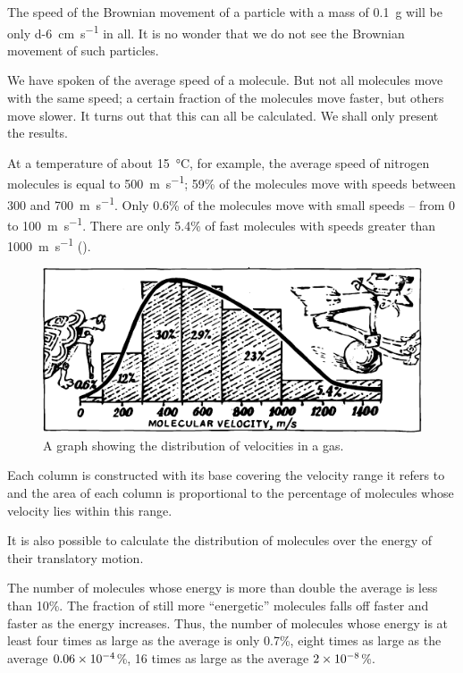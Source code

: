 The speed of the Brownian movement of a particle with a mass of \SI{0.1}{\gram} will be only \SI{d-6}{\centi\meter\per\second} in all. It is no wonder that we do not see the Brownian movement of such particles.

We have spoken of the average speed of a molecule. But not all molecules move with the same speed; a certain fraction of the molecules move faster, but others move slower. It turns out that this can all be calculated. We shall only present the results.

At a temperature of about \SI{15}{\celsius}, for example, the average speed of nitrogen molecules is equal to \SI{500}{\meter\per\second}; 59\% of the molecules move with speeds between 300 and \SI{700}{\meter\per\second}. Only 0.6\% of the molecules move with small speeds -- from 0 to \SI{100}{\meter\per\second}. There are only 5.4\% of fast molecules with speeds greater than \SI{1000}{\meter\per\second} ().

\begin{figure}[!ht]
\centering
\includegraphics[width=\textwidth]{figures/fig-03-02.pdf}
\caption{A graph showing the distribution of velocities in a gas.}
\label{fig-3.2}
\end{figure}

Each column is constructed with its base covering the velocity range it refers to and the area of each column is proportional to the percentage of molecules whose veloc­ity lies within this range.

It is also possible to calculate the distribution of molecules over the energy of their translatory motion.

The number of molecules whose energy is more than double the average is less than 10\%. The fraction of still more “energetic” molecules falls off faster and faster as the energy increases. Thus, the number of molecules whose energy is at least four times as large as the average is only 0.7\%, eight times as large as the average $0.06 \times
 \num{d-4}$\%, 16 times as large as the average $2 \times \num{d-8}$\%. 
 
